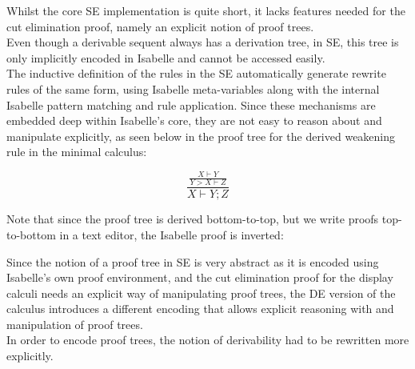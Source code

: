 Whilst the core SE implementation is quite short, it lacks features
needed for the cut elimination proof, namely an explicit notion of proof
trees.\\Even though a derivable sequent always has a derivation tree, in
SE, this tree is only implicitly encoded in Isabelle and cannot be
accessed easily.\\The inductive definition of the rules in the SE
automatically generate rewrite rules of the same form, using Isabelle
meta-variables along with the internal Isabelle pattern matching and
rule application. Since these mechanisms are embedded deep within
Isabelle's core, they are not easy to reason about and manipulate
explicitly, as seen below in the proof tree for the derived weakening
rule in the minimal calculus:

\[\frac{\displaystyle \frac
{X \vdash Y}
{Y > X \vdash Z} }
{X \vdash Y ; Z}\]

Note that since the proof tree is derived bottom-to-top, but we write
proofs top-to-bottom in a text editor, the Isabelle proof is inverted:

\begin{Shaded}
\begin{Highlighting}[]
  
    
                  \ErrorTok{(*}       \ErrorTok{*)}
     \ErrorTok{(*}      \ErrorTok{*)}
             \ErrorTok{(*}         \ErrorTok{*)}
                \ErrorTok{(*}               \ErrorTok{*)}
\end{Highlighting}
\end{Shaded}

Since the notion of a proof tree in SE is very abstract as it is encoded
using Isabelle's own proof environment, and the cut elimination proof
for the display calculi needs an explicit way of manipulating proof
trees, the DE version of the calculus introduces a different encoding
that allows explicit reasoning with and manipulation of proof trees.\\In
order to encode proof trees, the notion of derivability had to be
rewritten more explicitly.


